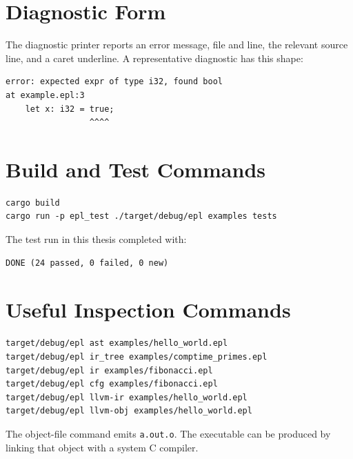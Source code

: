 \section{Diagnostic Form}

The diagnostic printer reports an error message, file and line, the relevant
source line, and a caret underline. A representative diagnostic has this shape:

\begin{lstlisting}[caption={Representative diagnostic shape}]
error: expected expr of type i32, found bool
at example.epl:3
    let x: i32 = true;
                 ^^^^
\end{lstlisting}

\section{Build and Test Commands}

\begin{lstlisting}[caption={Commands used to build and test the project}]
cargo build
cargo run -p epl_test ./target/debug/epl examples tests
\end{lstlisting}

The test run in this thesis completed with:

\begin{lstlisting}[caption={Observed test result}]
DONE (24 passed, 0 failed, 0 new)
\end{lstlisting}

\section{Useful Inspection Commands}

\begin{lstlisting}[caption={Compiler inspection commands}]
target/debug/epl ast examples/hello_world.epl
target/debug/epl ir_tree examples/comptime_primes.epl
target/debug/epl ir examples/fibonacci.epl
target/debug/epl cfg examples/fibonacci.epl
target/debug/epl llvm-ir examples/hello_world.epl
target/debug/epl llvm-obj examples/hello_world.epl
\end{lstlisting}

The object-file command emits \texttt{a.out.o}. The executable can be produced
by linking that object with a system C compiler.
